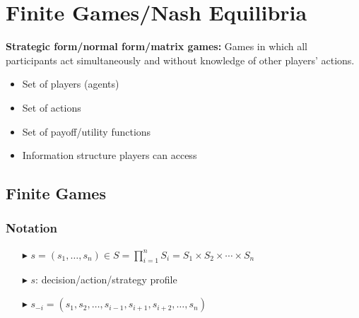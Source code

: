 \documentclass[../Main.tex]{subfiles}
\begin{document}
\chapter{Finite Games/Nash Equilibria}
\textbf{Strategic form/normal form/matrix games:} Games in which all participants act simultaneously and without knowledge of other players' actions.
\begin{itemize}
    \item Set of players (agents)
    \item Set of actions 
    \item Set of payoff/utility functions
    \item Information structure players can access
\end{itemize}

\section{Finite Games}

\subsection*{Notation}
\begin{itemize}
    \item[$\blacktriangleright$] $s = (s_1, \ldots, s_n) \in S = \prod_{i=1}^n S_i = S_1 \times S_2 \times \cdots \times S_n$
    \item[$\blacktriangleright$] $s$: decision/action/strategy profile
    \item[$\blacktriangleright$] $s_{-i} = (s_1, s_2, \ldots, s_{i-1}, s_{i+1}, s_{i+2}, \ldots, s_n)$
\end{itemize}
\end{document}
